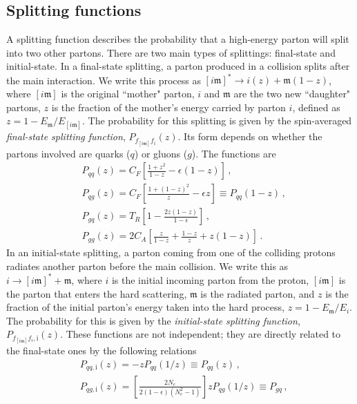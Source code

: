 \documentclass[a4paper, 12pt]{book}
\newcommand{\um}{\mathfrak{m}}
\begin{document}
\begin{appendices}
\section{Splitting functions}
A splitting function describes the probability that a high-energy parton will split into two other partons. There are two main types of splittings: final-state and initial-state. In a final-state splitting, a parton produced in a collision splits after the main interaction. We write this process as $[i\um]^* \to i(z) + \um(1-z)$, where $[i\um]$ is the original ``mother" parton, $i$ and $\um$ are the two new ``daughter" partons, $z$ is the fraction of the mother's energy carried by parton $i$, defined as $z = 1 - E_\um / E_{[i\um]}$. The probability for this splitting is given by the spin-averaged \emph{final-state splitting function}, $P_{f_{[i\um]}f_i}(z)$. Its form depends on whether the partons involved are quarks ($q$) or gluons ($g$). The functions are
\begin{equation}
  \begin{split}
    & P_{qq}(z) = C_F \left[\frac{1+z^2}{1-z}-\epsilon(1-z)\right]\, , \\
    & P_{qg}(z)= C_F \left[\frac{1+(1-z)^2}{z}-\epsilon z\right] \equiv P_{qq}(1-z)\, , \\
    & P_{gq}(z) = T_R \left[1-\frac{2z(1-z)}{1-\epsilon}\right] \, , \\
    & P_{gg} (z) = 2 C_A \left[\frac{z}{1-z}+\frac{1-z}{z}+z(1-z)\right] \, .
  \end{split}
  \label{splitting-functions}
\end{equation}
In an initial-state splitting, a parton coming from one of the colliding protons radiates another parton before the main collision. We write this as $i \to [i\um]^* + \um$, where $i$ is the initial incoming parton from the proton, $[i\um]$ is the parton that enters the hard scattering, $\um$ is the radiated parton, and $z$ is the fraction of the initial parton's energy taken into the hard process, $z = 1 - E_\um / E_i$. The probability for this is given by the \emph{initial-state splitting function}, $P_{f_{[i\um]}f_i, \mathrm{i}}(z)$. These functions are not independent; they are directly related to the final-state ones by the following relations
\begin{equation}
  \begin{split}
    & P_{qq, \mathrm{i}} (z) = -zP_{qq}(1/z) \equiv P_{qq}(z) \, , \\
    & P_{qg, \mathrm{i}} (z) = \left[\frac{2N_c}{2(1-\epsilon)(N_c^2-1)}\right]zP_{qg}(1/z) \equiv P_{gq} \, , \\

\end{split}
\end{equation}
\end{appendices}
\end{document}
